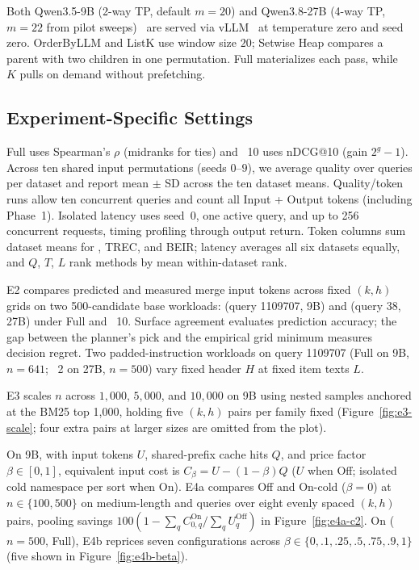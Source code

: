 Both Qwen3.5-9B (2-way TP, default $m{=}20$) and Qwen3.8-27B (4-way TP, $m{=}22$ from pilot sweeps)~\cite{DBLP:journals/corr/abs-2505-09388} are served via vLLM~\cite{kwon2023efficient} at temperature zero and seed zero. OrderByLLM and ListK use window size $20$; Setwise Heap compares a parent with two children in one permutation. Full materializes each pass, while \LIMIT~$K$ pulls on demand without prefetching.



\subsection{Experiment-Specific Settings}
\label{sec:exp:protocols}

Full uses Spearman's $\rho$ (midranks for ties) and \LIMIT~10 uses nDCG@10 (gain $2^g - 1$). Across ten shared input permutations (seeds $0$--$9$), we average quality over queries per dataset and report mean $\pm$ SD across the ten dataset means. Quality/token runs allow ten concurrent queries and count all Input + Output tokens (including Phase~1). Isolated latency uses seed~$0$, one active query, and up to 256 concurrent requests, timing profiling through output return. Token columns sum dataset means for \Qnine, TREC, and BEIR; latency averages all six datasets equally, and $Q$, $T$, $L$ rank methods by mean within-dataset rank.

E2 compares predicted and measured merge input tokens across fixed $(k,h)$ grids on two 500-candidate base workloads: \DLtwozero{} (query 1109707, 9B) and \COVID{} (query 38, 27B) under Full and \LIMIT~10. Surface agreement evaluates prediction accuracy; the gap between the planner's pick and the empirical grid minimum measures decision regret. Two padded-instruction workloads on \DLtwozero{} query 1109707 (Full on 9B, $n{=}641$; \LIMIT~2 on 27B, $n{=}500$) vary fixed header $H$ at fixed item texts $L$.

E3 scales $n$ across $1{,}000$, $5{,}000$, and $10{,}000$ on 9B \DLtwozero{} using nested samples anchored at the BM25 top 1,000, holding five $(k,h)$ pairs per family fixed (Figure~\ref{fig:e3-scale}; four extra \LT{} pairs at larger sizes are omitted from the plot).

On 9B, with input tokens $U$, shared-prefix cache hits $Q$, and price factor $\beta \in [0,1]$, equivalent input cost is $C_\beta = U - (1-\beta)Q$ ($U$ when Off; isolated cold namespace per sort when On). E4a compares Off and On-cold ($\beta{=}0$) at $n \in \{100, 500\}$ on medium-length \DLtwozero{} and \COVIDshort{} queries over eight evenly spaced $(k,h)$ pairs, pooling savings $100(1 - \sum_q C_{0,q}^{\mathrm{On}} / \sum_q U_q^{\mathrm{Off}})$ in Figure~\ref{fig:e4a-c2}. On \DLtwozero{} ($n{=}500$, \LT{} Full), E4b reprices seven configurations across $\beta \in \{0,.1,.25,.5,.75,.9,1\}$ (five shown in Figure~\ref{fig:e4b-beta}).

